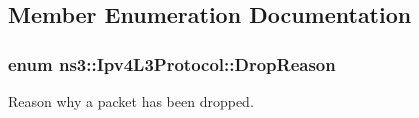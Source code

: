 \subsection{Member Enumeration Documentation}
\subsubsection[{\texorpdfstring{Drop\+Reason}{DropReason}}]{\setlength{\rightskip}{0pt plus 5cm}enum {\bf ns3\+::\+Ipv4\+L3\+Protocol\+::\+Drop\+Reason}}\hypertarget{classns3_1_1Ipv4L3Protocol_a05e7403d60c79529257c4cffdd994da1}{}\label{classns3_1_1Ipv4L3Protocol_a05e7403d60c79529257c4cffdd994da1}


Reason why a packet has been dropped. 

